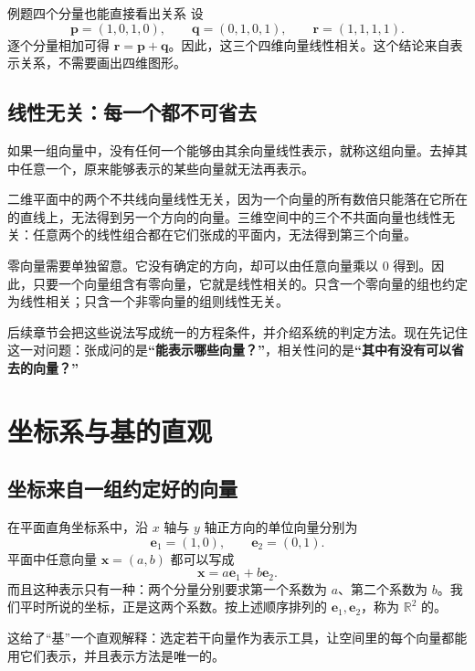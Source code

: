 \documentclass[a4paper,12pt,twoside,openany,fontset=none]{ctexbook}
\newcounter{example}[chapter]
\newenvironment{example}[1][]{\begin{exBox}{例题}{#1}}{\end{exBox}}
\numberwithin{equation}{chapter}
\begin{document}
\begin{example}[四个分量也能直接看出关系]
设
\[
    \boldsymbol{p}=(1,0,1,0),\qquad
    \boldsymbol{q}=(0,1,0,1),\qquad
    \boldsymbol{r}=(1,1,1,1).
\]
逐个分量相加可得 $\boldsymbol{r}=\boldsymbol{p}+\boldsymbol{q}$。因此，这三个四维向量线性相关。这个结论来自表示关系，不需要画出四维图形。
\end{example}

\subsection*{线性无关：每一个都不可省去}

如果一组向量中，没有任何一个能够由其余向量线性表示，就称这组向量\textbf{}。去掉其中任意一个，原来能够表示的某些向量就无法再表示。

二维平面中的两个不共线向量线性无关，因为一个向量的所有数倍只能落在它所在的直线上，无法得到另一个方向的向量。三维空间中的三个不共面向量也线性无关：任意两个的线性组合都在它们张成的平面内，无法得到第三个向量。

零向量需要单独留意。它没有确定的方向，却可以由任意向量乘以 $0$ 得到。因此，只要一个向量组含有零向量，它就是线性相关的。只含一个零向量的组也约定为线性相关；只含一个非零向量的组则线性无关。

后续章节会把这些说法写成统一的方程条件，并介绍系统的判定方法。现在先记住这一对问题：张成问的是\textbf{“能表示哪些向量？”}，相关性问的是\textbf{“其中有没有可以省去的向量？”}

\section{坐标系与基的直观}
\label{sec:zero-basis}

\subsection*{坐标来自一组约定好的向量}

在平面直角坐标系中，沿 $x$ 轴与 $y$ 轴正方向的单位向量分别为
\[
    \boldsymbol{e}_1=(1,0),\qquad \boldsymbol{e}_2=(0,1).
\]
平面中任意向量 $\boldsymbol{x}=(a,b)$ 都可以写成
\[
    \boldsymbol{x}=a\boldsymbol{e}_1+b\boldsymbol{e}_2.
\]
而且这种表示只有一种：两个分量分别要求第一个系数为 $a$、第二个系数为 $b$。我们平时所说的坐标，正是这两个系数。按上述顺序排列的 $\boldsymbol{e}_1,\boldsymbol{e}_2$，称为 $\mathbb{R}^2$ 的\textbf{}。

这给了“基”一个直观解释：选定若干向量作为表示工具，让空间里的每个向量都能用它们表示，并且表示方法是唯一的。
\end{document}
